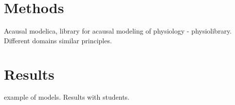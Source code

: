 \documentclass[letterpaper, 10 pt, conference]{ieeeconf}  %
\begin{document}





 

\section{Methods}

Acausal modelica, library for acausal modeling of physiology - physiolibrary.
Different domains similar principles.


\section{Results}

example of models. Results with students.


\addtolength{\textheight}{-12cm}   %
\end{document}
